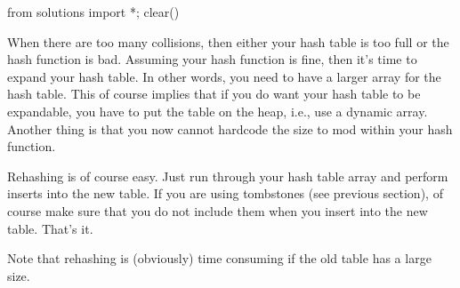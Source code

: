 \begin{python0}
from solutions import *; clear()
\end{python0}

When there are too many collisions, then either your hash table is
too full or the hash function is bad.
Assuming your hash function is fine, then it's time to expand your
hash table.
In other words, you need to have a larger array for the hash table.
This of course implies that if you do want your hash table
to be expandable, you have to put the table on the heap, i.e.,
use a dynamic array.
Another thing is that you now cannot hardcode the size to mod within
your hash function. 

Rehashing is of course easy.
Just run through your hash table array and perform inserts into the new
table.
If you are using tombstones (see previous section), of course make
sure that you do not include them when you insert into the new table.
That's it.

Note that rehashing is (obviously) time consuming if the old table
has a large size.




\newpage
